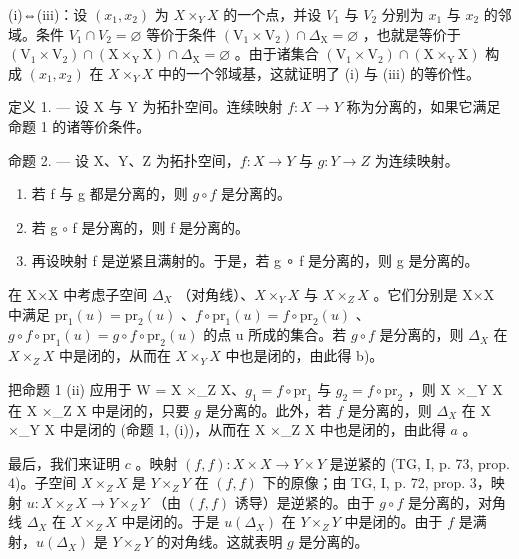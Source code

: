 (i)⇔(iii)：设 \((x_{1}, x_{2})\) 为 \(X \times_{Y} X\) 的一个点，并设 \(V_{1}\) 与 \(V_{2}\) 分别为 \(x_{1}\) 与 \(x_{2}\) 的邻域。条件 \(V_{1} \cap V_{2} = \varnothing\) 等价于条件 \((\mathrm{V}_{1} \times \mathrm{V}_{2}) \cap \Delta_{\mathrm{X}} = \varnothing\) ，也就是等价于 \((\mathrm{V}_{1} \times \mathrm{V}_{2}) \cap (\mathrm{X} \times_{\mathrm{Y}} \mathrm{X}) \cap \Delta_{\mathrm{X}} = \varnothing\) 。由于诸集合 \((\mathrm{V}_{1} \times \mathrm{V}_{2}) \cap (\mathrm{X} \times_{\mathrm{Y}} \mathrm{X})\) 构成 \((x_{1}, x_{2})\) 在 \(X \times_{Y} X\) 中的一个邻域基，这就证明了 (i) 与 (iii) 的等价性。

定义 1. --- 设 X 与 Y 为拓扑空间。连续映射 \(f: X \to Y\) 称为分离的，如果它满足命题 1 的诸等价条件。

命题 2. --- 设 X、Y、Z 为拓扑空间，\(f\colon X \to Y\) 与 \(g\colon Y \to Z\) 为连续映射。

\begin{enumerate}
\def\labelenumi{\alph{enumi})}
\item
  若 f 与 g 都是分离的，则 \(g \circ f\) 是分离的。
\item
若 g \(\circ\) f 是分离的，则 f 是分离的。
\item
  再设映射 f 是逆紧且满射的。于是，若 g ∘ f 是分离的，则 g 是分离的。
\end{enumerate}

在 X×X 中考虑子空间 \(\Delta_{X}\) （对角线）、\(X \times_Y X\) 与 \(X \times_Z X\) 。它们分别是 X×X 中满足 \(\mathrm{pr}_{1}(u)=\mathrm{pr}_{2}(u)\) 、\(f\circ\mathrm{pr}_{1}(u)=f\circ\mathrm{pr}_{2}(u)\) 、\(g\circ f\circ\mathrm{pr}_{1}(u)=g\circ f\circ\mathrm{pr}_{2}(u)\) 的点 u 所成的集合。若 \(g\circ f\) 是分离的，则 \(\Delta_{X}\) 在 \(X \times_Z X\) 中是闭的，从而在 \(X \times_Y X\) 中也是闭的，由此得 b)。

把命题 1 (ii) 应用于 W = X ×\_Z X、\(g_1 = f \circ \text{pr}_1\) 与 \(g_2 = f \circ \text{pr}_2\) ，则 X ×\_Y X 在 X ×\_Z X 中是闭的，只要 \(g\) 是分离的。此外，若 \(f\) 是分离的，则 \(\Delta_X\) 在 X ×\_Y X 中是闭的 (命题 1, (i))，从而在 X ×\_Z X 中也是闭的，由此得 \(a\) 。

最后，我们来证明 \(c\) 。映射 \((f, f) \colon X \times X \to Y \times Y\) 是逆紧的 (TG, I, p. 73, prop. 4)。子空间 \(X \times_Z X\) 是 \(Y \times_Z Y\) 在 \((f, f)\) 下的原像；由 TG, I, p. 72, prop. 3，映射 \(u \colon X \times_Z X \to Y \times_Z Y\) （由 \((f, f)\) 诱导）是逆紧的。由于 \(g \circ f\) 是分离的，对角线 \(\Delta_X\) 在 \(X \times_Z X\) 中是闭的。于是 \(u(\Delta_X)\) 在 \(Y \times_Z Y\) 中是闭的。由于 \(f\) 是满射，\(u(\Delta_X)\) 是 \(Y \times_Z Y\) 的对角线。这就表明 \(g\) 是分离的。


